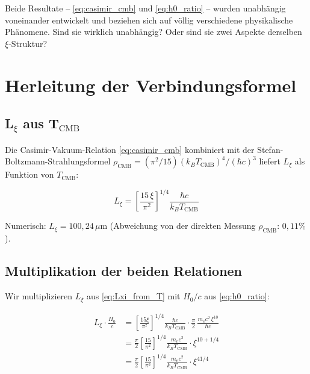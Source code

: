 Beide Resultate -- \eqref{eq:casimir_cmb} und \eqref{eq:h0_ratio} -- wurden
unabhängig voneinander entwickelt und beziehen sich auf völlig verschiedene
physikalische Phänomene. Sind sie wirklich unabhängig? Oder sind sie zwei
Aspekte derselben $\xi$-Struktur?

\section{Herleitung der Verbindungsformel}
\label{sec:herleitung}

\subsection{L\texorpdfstring{$_\xi$}{xi} aus T\texorpdfstring{$_\text{CMB}$}{CMB}}

Die Casimir-Vakuum-Relation \eqref{eq:casimir_cmb} kombiniert mit der
Stefan-Boltzmann-Strahlungsformel
$\rho_\text{CMB} = (\pi^2/15)(k_B T_\text{CMB})^4/(\hbar c)^3$
liefert $L_\xi$ als Funktion von $T_\text{CMB}$:

\begin{equation}
    L_\xi = \left[\frac{15\,\xi}{\pi^2}\right]^{1/4}
    \frac{\hbar c}{k_B T_\text{CMB}}
    \label{eq:Lxi_from_T}
\end{equation}

Numerisch: $L_\xi = 100{,}24\,\mu\text{m}$
(Abweichung von der direkten Messung $\rho_\text{CMB}$: $0{,}11\%$).

\subsection{Multiplikation der beiden Relationen}

Wir multiplizieren $L_\xi$ aus \eqref{eq:Lxi_from_T} mit $H_0/c$ aus
\eqref{eq:h0_ratio}:

\begin{align}
    L_\xi \cdot \frac{H_0}{c}
    &= \left[\frac{15\xi}{\pi^2}\right]^{1/4}
       \frac{\hbar c}{k_B T_\text{CMB}}
       \cdot \frac{\pi}{2}\,\frac{m_e c^2\,\xi^{10}}{\hbar c}
    \nonumber\\[6pt]
    &= \frac{\pi}{2}\left[\frac{15}{\pi^2}\right]^{1/4}
       \frac{m_e c^2}{k_B T_\text{CMB}}
       \cdot \xi^{10 + 1/4}
    \nonumber\\[6pt]
    &= \frac{\pi}{2}\left[\frac{15}{\pi^2}\right]^{1/4}
       \frac{m_e c^2}{k_B T_\text{CMB}}
       \cdot \xi^{41/4}
    \label{eq:bridge_derivation}
\end{align}

